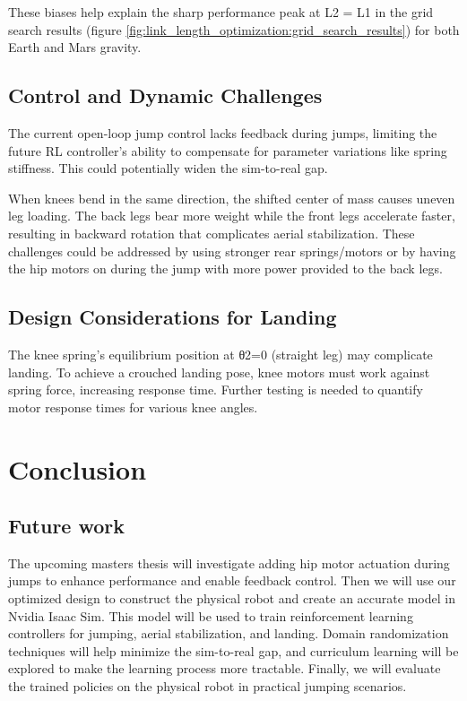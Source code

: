 These biases help explain the sharp performance peak at L2 = L1 in the grid search results (figure \ref{fig:link_length_optimization:grid_search_results}) for both Earth and Mars gravity.

\subsection{Control and Dynamic Challenges}
The current open-loop jump control lacks feedback during jumps, limiting the future RL controller's ability to compensate for parameter variations like spring stiffness. This could potentially widen the sim-to-real gap.

When knees bend in the same direction, the shifted center of mass causes uneven leg loading. The back legs bear more weight while the front legs accelerate faster, resulting in backward rotation that complicates aerial stabilization. These challenges could be addressed by using stronger rear springs/motors or by having the hip motors on during the jump with more power provided to the back legs.

\subsection{Design Considerations for Landing}
The knee spring's equilibrium position at θ2=0 (straight leg) may complicate landing. To achieve a crouched landing pose, knee motors must work against spring force, increasing response time. Further testing is needed to quantify motor response times for various knee angles.

\section{Conclusion}


\subsection{Future work}
The upcoming masters thesis will investigate adding hip motor actuation during jumps to enhance performance and enable feedback control. Then we will use our optimized design to construct the physical robot and create an accurate model in Nvidia Isaac Sim. This model will be used to train reinforcement learning controllers for jumping, aerial stabilization, and landing. Domain randomization techniques will help minimize the sim-to-real gap, and curriculum learning will be explored to make the learning process more tractable. Finally, we will evaluate the trained policies on the physical robot in practical jumping scenarios.
